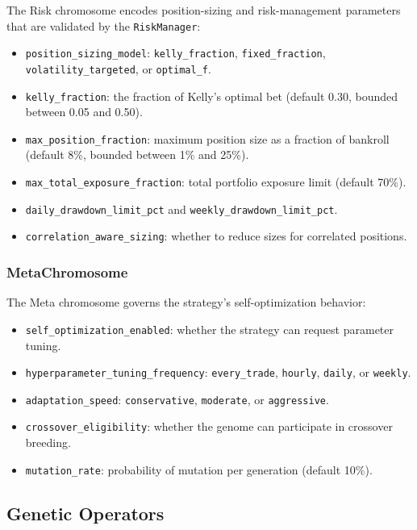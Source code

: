 The Risk chromosome encodes position-sizing and risk-management parameters that are validated by the \texttt{RiskManager}:
\begin{itemize}
    \item \texttt{position\_sizing\_model}: \texttt{kelly\_fraction}, \texttt{fixed\_fraction}, \texttt{volatility\_targeted}, or \texttt{optimal\_f}.
    \item \texttt{kelly\_fraction}: the fraction of Kelly's optimal bet (default 0.30, bounded between 0.05 and 0.50).
    \item \texttt{max\_position\_fraction}: maximum position size as a fraction of bankroll (default 8\%, bounded between 1\% and 25\%).
    \item \texttt{max\_total\_exposure\_fraction}: total portfolio exposure limit (default 70\%).
    \item \texttt{daily\_drawdown\_limit\_pct} and \texttt{weekly\_drawdown\_limit\_pct}.
    \item \texttt{correlation\_aware\_sizing}: whether to reduce sizes for correlated positions.
\end{itemize}

\subsubsection{MetaChromosome}

The Meta chromosome governs the strategy's self-optimization behavior:
\begin{itemize}
    \item \texttt{self\_optimization\_enabled}: whether the strategy can request parameter tuning.
    \item \texttt{hyperparameter\_tuning\_frequency}: \texttt{every\_trade}, \texttt{hourly}, \texttt{daily}, or \texttt{weekly}.
    \item \texttt{adaptation\_speed}: \texttt{conservative}, \texttt{moderate}, or \texttt{aggressive}.
    \item \texttt{crossover\_eligibility}: whether the genome can participate in crossover breeding.
    \item \texttt{mutation\_rate}: probability of mutation per generation (default 10\%).
\end{itemize}

\subsection{Genetic Operators}

